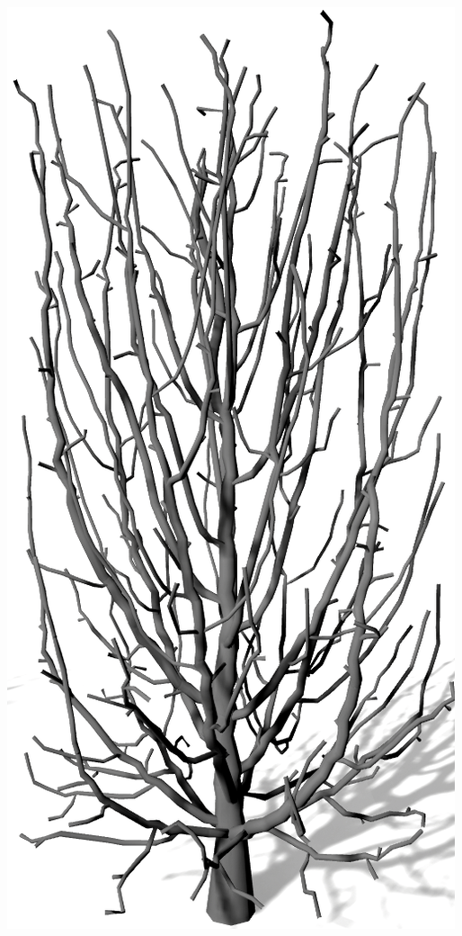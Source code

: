 \newpage
{}
\begin{center}
	\vfill
	\begin{minipage}[c]{0.45\textwidth}
		\centering
		\includegraphics[height=.9\textheight]{images/SCA_Einfluss_Cylinder_High}

\end{minipage}
\end{center}
